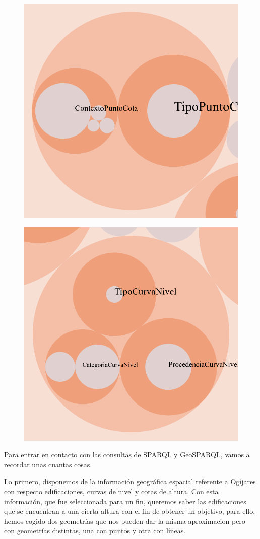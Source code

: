 \begin{figure}[H]
	\centering
	\includegraphics[width=0.7\linewidth]{imagenes/capitulo4/class-hierarchy-TFM-3}
	\caption{}
	\label{fig:class-hierarchy-tfm-3}
\end{figure}

\begin{figure}[H]
	\centering
	\includegraphics[width=0.7\linewidth]{imagenes/capitulo4/class-hierarchy-TFM-4}
	\caption{}
	\label{fig:class-hierarchy-tfm-4}
\end{figure}





Para entrar en contacto con las consultas de SPARQL y GeoSPARQL, vamos a recordar unas cuantas cosas.

Lo primero, disponemos de la información geográfica espacial referente a Ogíjares con respecto edificaciones, curvas de nivel y cotas de altura. Con esta información, que fue seleccionada para un fin, queremos saber las edificaciones que se encuentran a una cierta altura con el fin de obtener un objetivo, para ello, hemos cogido dos geometrías que nos pueden dar la misma aproximacion pero con geometrías distintas, una con puntos y otra con líneas.



